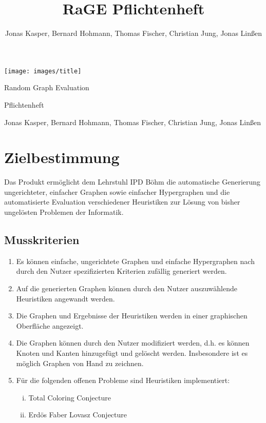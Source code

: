 \documentclass{article}
\title{RaGE Pflichtenheft}
\author{Jonas Kasper, Bernard Hohmann, Thomas Fischer, Christian Jung, Jonas Linßen}
\newcommand{\titlesize}{\fontsize{35pt}{20pt}\selectfont}
\newcommand{\themesize}{\fontsize{20pt}{20pt}\selectfont}
\newcommand{\authorsize}{\fontsize{15pt}{20pt}\selectfont}
\begin{document}
	
	
	\begin{titlepage}
		\centering \texttt{[image: images/title]}
		
		\titlesize \hspace*{.5cm} Random Graph Evaluation
		~\newline~\newline
		
		\themesize \hspace*{3cm} Pflichtenheft
		\newline~\newline
		
		\authorsize Jonas Kasper, Bernard Hohmann, Thomas Fischer, Christian Jung, Jonas Linßen
	\end{titlepage}
	
	\tableofcontents
	
	\newpage
	
	
	\section{Zielbestimmung}
	Das Produkt ermöglicht dem Lehrstuhl IPD Böhm die automatische Generierung ungerichteter, einfacher Graphen sowie einfacher Hypergraphen und die automatisierte Evaluation verschiedener Heuristiken zur Lösung von bisher ungelösten Problemen der Informatik.
	
	\subsection{Musskriterien}
	\begin{enumerate}[(M1)]
		\item{Es können einfache, ungerichtete Graphen und einfache Hypergraphen nach durch den Nutzer spezifizierten Kriterien zufällig generiert werden.}
		\item{Auf die generierten Graphen können durch den Nutzer auszuwählende Heuristiken angewandt werden.}
		\item{Die Graphen und Ergebnisse der Heuristiken werden in einer graphischen Oberfläche angezeigt.}
		\item{Die Graphen können durch den Nutzer modifiziert werden, d.h. es können Knoten und Kanten hinzugefügt und gelöscht werden. Insbesondere ist es möglich Graphen von Hand zu zeichnen.}
		\item{Für die folgenden offenen Probleme sind Heuristiken implementiert:
			\begin{enumerate}[i)]
				\item{Total Coloring Conjecture}
				\item{Erdös Faber Lovasz Conjecture}
			\end{enumerate}
		}
	\end{enumerate}
	
\end{document}
